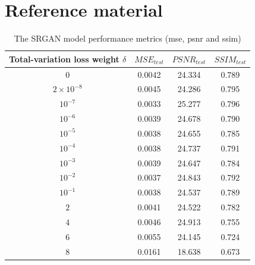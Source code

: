 \documentclass[conference]{IEEEtran}
\begin{document}



\section{Reference material}

\begin{table}[htb]
	\centering
	\caption{The SRGAN model performance metrics (\acrshort{mse}, \acrshort{psnr} and \acrshort{ssim})}
	\label{tab:metrics}
	\begin{tabular}{|c|c|c|c|}
	\hline
	Total-variation loss weight $\delta$ & $MSE_{test}$ & $PSNR_{test}$ & $SSIM_{test}$  \\ \hline
	$0$                                 & 0.0042       & 24.334        & 0.789          \\ \hline
	$2 \times 10^{-8}$                  & 0.0045       & 24.286        & 0.795          \\ \hline
	$10^{-7}$                           & 0.0033       & 25.277        & 0.796          \\ \hline
	$10^{-6}$                           & 0.0039       & 24.678        & 0.790          \\ \hline
	$10^{-5}$                           & 0.0038       & 24.655        & 0.785          \\ \hline
	$10^{-4}$                           & 0.0038       & 24.737        & 0.791          \\ \hline
	$10^{-3}$                           & 0.0039       & 24.647        & 0.784          \\ \hline
	$10^{-2}$                           & 0.0037       & 24.843        & 0.792          \\ \hline
	$10^{-1}$                           & 0.0038       & 24.537        & 0.789          \\ \hline
	$2$                                 & 0.0041       & 24.522        & 0.782          \\ \hline
	$4$                                 & 0.0046       & 24.913        & 0.755          \\ \hline
	$6$                                 & 0.0055       & 24.145        & 0.724          \\ \hline
	$8$                                 & 0.0161       & 18.638        & 0.673          \\ \hline
\end{tabular}
\end{table}
\end{document}
